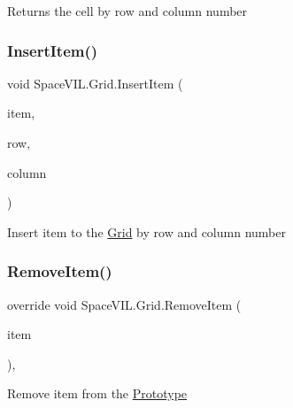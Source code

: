 Returns the cell by row and column number 

\mbox{\label{class_space_v_i_l_1_1_grid_a2292fca3813854b6077716e00ad54df4}} 
\subsubsection{\texorpdfstring{Insert\+Item()}{InsertItem()}}
{\footnotesize\ttfamily void Space\+V\+I\+L.\+Grid.\+Insert\+Item (\begin{DoxyParamCaption}\item[{\mbox{\hyperlink{interface_space_v_i_l_1_1_core_1_1_i_base_item}{I\+Base\+Item}}}]{item,  }\item[{int}]{row,  }\item[{int}]{column }\end{DoxyParamCaption})\hspace{0.3cm}{\ttfamily [inline]}}



Insert item to the \mbox{\hyperlink{class_space_v_i_l_1_1_grid}{Grid}} by row and column number 

\mbox{\label{class_space_v_i_l_1_1_grid_a75bf61cabb387baea7461141dce079fb}} 
\subsubsection{\texorpdfstring{Remove\+Item()}{RemoveItem()}}
{\footnotesize\ttfamily override void Space\+V\+I\+L.\+Grid.\+Remove\+Item (\begin{DoxyParamCaption}\item[{\mbox{\hyperlink{interface_space_v_i_l_1_1_core_1_1_i_base_item}{I\+Base\+Item}}}]{item }\end{DoxyParamCaption})\hspace{0.3cm}{\ttfamily [inline]}, {\ttfamily [virtual]}}



Remove item from the \mbox{\hyperlink{class_space_v_i_l_1_1_prototype}{Prototype}} 



